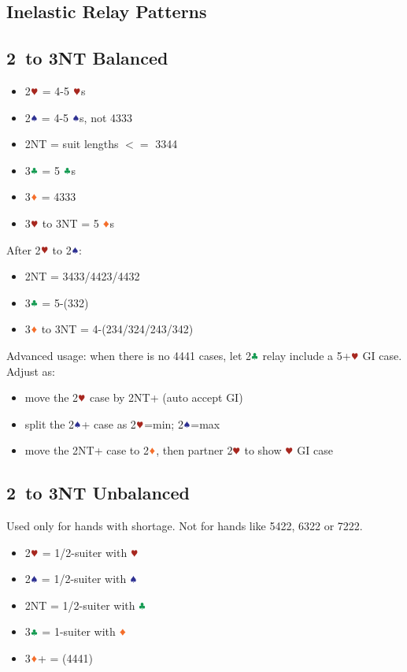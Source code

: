 \documentclass{article}
\begin{document}
\begin{multicols}{2}
\section{Inelastic Relay Patterns}

\subsection{2\HHH\ to 3NT Balanced}
\label{sec:2h-3nt-bal}

\begin{itemize}
    \item 2$\hhh$ = 4-5 $\hhh$s
    \item 2$\sss$ = 4-5 $\sss$s, not 4333
    \item 2NT = suit lengths $<=$ 3344
    \item 3$\ccc$ = 5 $\ccc$s
    \item 3$\ddd$ = 4333
    \item 3$\hhh$ to 3NT = 5 $\ddd$s
\end{itemize}

\noindent After 2$\hhh$ to 2$\sss$:
\begin{itemize}
    \item 2NT = 3433/4423/4432
    \item 3$\ccc$ = 5-(332)
    \item 3$\ddd$ to 3NT = 4-(234/324/243/342)
\end{itemize}

\noindent Advanced usage: when there is no 4441 cases, let 2$\ccc$ relay include a 5+$\hhh$ GI case. Adjust as:
\begin{itemize}
    \item move the 2$\hhh$ case by 2NT+ (auto accept GI)
    \item split the 2$\sss$+ case as 2$\hhh$=min; 2$\sss$=max
    \item move the 2NT+ case to 2$\ddd$, then partner 2$\hhh$ to show $\hhh$ GI case
\end{itemize}

\subsection{2\HHH\ to 3NT Unbalanced}
\label{sec:2h-3nt-unbal}
Used only for hands with shortage. Not for hands like 5422, 6322 or 7222.

\begin{itemize}
    \item 2$\hhh$ = 1/2-suiter with $\hhh$
    \item 2$\sss$ = 1/2-suiter with $\sss$
    \item 2NT = 1/2-suiter with $\ccc$
    \item 3$\ccc$ = 1-suiter with $\ddd$
    \item 3$\ddd$+ = (4441)
\end{itemize}


\end{multicols}
\end{document}
